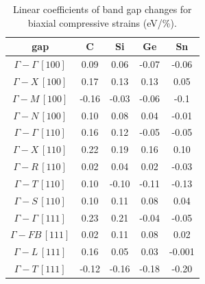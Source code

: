 \begin{table}[!htbp]
    \centering
    \caption{Linear coefficients of band gap changes for biaxial compressive strains (eV/\%).}
    \begin{tabular}{|c|c|c|c|c|}
        \hline
        gap          & C & Si & Ge & Sn \\ \hline
        $\Gamma-\Gamma\,[100]$  & 0.09  & 0.06  & -0.07 & -0.06 \\ \hline
        $\Gamma-X\,[100]$  & 0.17  & 0.13 & 0.13 & 0.05 \\ \hline
        $\Gamma-M\,[100]$  & -0.16 & -0.03 & -0.06 & -0.1 \\ \hline
        $\Gamma-N\,[100]$  & 0.10  & 0.08 & 0.04 & -0.01 \\ \hline
        $\Gamma-\Gamma\,[110]$  & 0.16 & 0.12 & -0.05 & -0.05 \\ \hline
        $\Gamma-X\,[110]$  & 0.22 & 0.19 & 0.16 & 0.10 \\ \hline
        $\Gamma-R\,[110]$  & 0.02 & 0.04 & 0.02 & -0.03 \\ \hline
        $\Gamma-T\,[110]$  & 0.10 & -0.10 & -0.11 & -0.13 \\ \hline
        $\Gamma-S\,[110]$  & 0.10 & 0.11 & 0.08 & 0.04 \\ \hline
        $\Gamma-\Gamma\,[111]$  & 0.23 & 0.21 & -0.04 & -0.05 \\ \hline
        $\Gamma-FB\,[111]$ & 0.02 & 0.11 & 0.08 & 0.02 \\ \hline
        $\Gamma-L\,[111]$  & 0.16 & 0.05 & 0.03 & -0.001 \\ \hline
        $\Gamma-T\,[111]$  & -0.12 & -0.16 & -0.18 & -0.20 \\ \hline
    \end{tabular}
    \label{Tab:strain_gap_bi_compressive}
\end{table}

